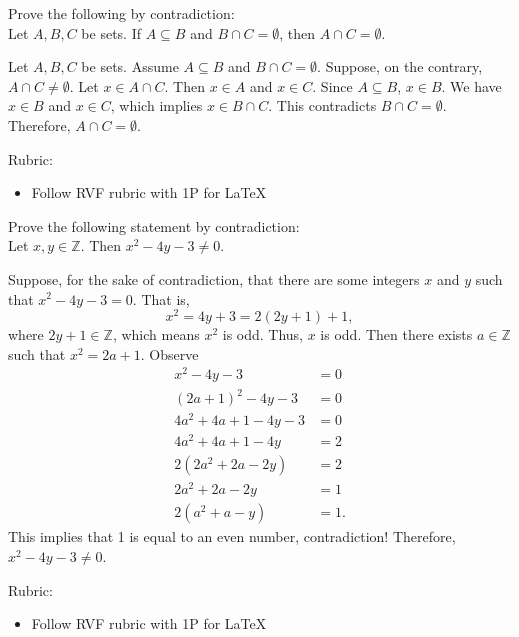 \documentclass{article}
\newcommand{\Z}{\mathbb{Z}}
\theoremstyle{definition}
\begin{document}
\begin{question}
    Prove the following by contradiction:\\
    Let $A, B, C$ be sets. If $A\subseteq B$ and $B\cap C=\emptyset$, then $A\cap C=\emptyset$.
\end{question}
\begin{solution}
      Let $A, B, C$ be sets. Assume $A\subseteq B$ and $B\cap C=\emptyset$. Suppose, on the contrary, $A\cap C\neq\emptyset$. Let $x\in A\cap C$. Then $x\in A$ and $x\in C$. Since $A\subseteq B$, $x\in B$. We have $x\in B$ and $x\in C$, which implies $x \in B\cap C$. This contradicts $B\cap C=\emptyset$. Therefore, $A\cap C=\emptyset$.
	
{\color{red} Rubric:
\begin{itemize}
\item Follow RVF rubric with 1P for \LaTeX
\end{itemize}}
\end{solution}

\begin{question}
    Prove the following statement by contradiction:\\
    Let $x, y\in \Z$. Then $x^2-4y-3\neq 0$.
\end{question}
\begin{solution}
Suppose, for the sake of contradiction, that there are some integers $x$ and $y$ such that $x^2 - 4y - 3 = 0$. That is,
	\[ x^2 = 4y+3 = 2(2y+1)+1, \]
where $2y+1\in \Z$, which means $x^2$ is odd. Thus, $x$ is odd. Then there exists $a\in \Z$ such that $x^2=2a+1$. Observe 
\begin{align*}
x^2 - 4y - 3 & = 0\\
(2a+1)^2 -4y -3 &= 0\\
4a^2+4a+1 -4y -3 & = 0\\
4a^2+4a+1 -4y & = 2\\
2(2a^2+2a - 2y) & = 2\\
2a^2+2a - 2y & = 1\\
2(a^2+a - y) & = 1.
\end{align*}
This implies that 1 is equal to an even number, contradiction! Therefore, $x^2-4y-3\neq 0$.

{\color{red} Rubric:
\begin{itemize}
\item Follow RVF rubric with 1P for \LaTeX
\end{itemize}}
\end{solution}
\end{document}
